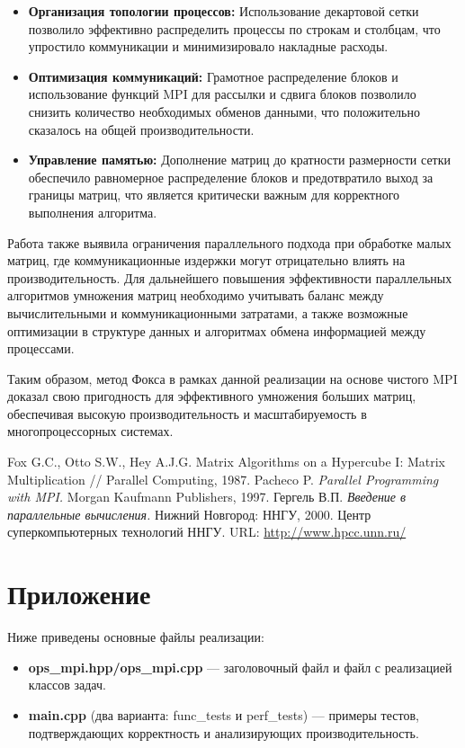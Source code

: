 \documentclass{report}
\begin{document}
\begin{itemize}
    \item \textbf{Организация топологии процессов:} Использование декартовой сетки позволило эффективно распределить процессы по строкам и столбцам, что упростило коммуникации и минимизировало накладные расходы.
    
    \item \textbf{Оптимизация коммуникаций:} Грамотное распределение блоков и использование функций MPI для рассылки и сдвига блоков позволило снизить количество необходимых обменов данными, что положительно сказалось на общей производительности.
    
    \item \textbf{Управление памятью:} Дополнение матриц до кратности размерности сетки обеспечило равномерное распределение блоков и предотвратило выход за границы матриц, что является критически важным для корректного выполнения алгоритма.
\end{itemize}

Работа также выявила ограничения параллельного подхода при обработке малых матриц, где коммуникационные издержки могут отрицательно влиять на производительность. Для дальнейшего повышения эффективности параллельных алгоритмов умножения матриц необходимо учитывать баланс между вычислительными и коммуникационными затратами, а также возможные оптимизации в структуре данных и алгоритмах обмена информацией между процессами.

Таким образом, метод Фокса в рамках данной реализации на основе чистого MPI доказал свою пригодность для эффективного умножения больших матриц, обеспечивая высокую производительность и масштабируемость в многопроцессорных системах.

\newpage

\begin{thebibliography}{1}

 Fox G.C., Otto S.W., Hey A.J.G. Matrix Algorithms on a Hypercube I: Matrix Multiplication // Parallel Computing, 1987.
 Pacheco P. \textit{Parallel Programming with MPI.} Morgan Kaufmann Publishers, 1997.
 Гергель В.П. \textit{Введение в параллельные вычисления.} Нижний Новгород: ННГУ, 2000.
 Центр суперкомпьютерных технологий ННГУ. URL: \url{http://www.hpcc.unn.ru/}
\end{thebibliography}

\section*{Приложение}
Ниже приведены основные файлы реализации: 
\begin{itemize}
    \item \textbf{ops\_mpi.hpp/ops\_mpi.cpp} — заголовочный файл и файл с реализацией классов задач. 
    \item \textbf{main.cpp} (два варианта: func\_tests и perf\_tests) — примеры тестов, подтверждающих корректность и анализирующих производительность.
\end{itemize}
\end{document}
